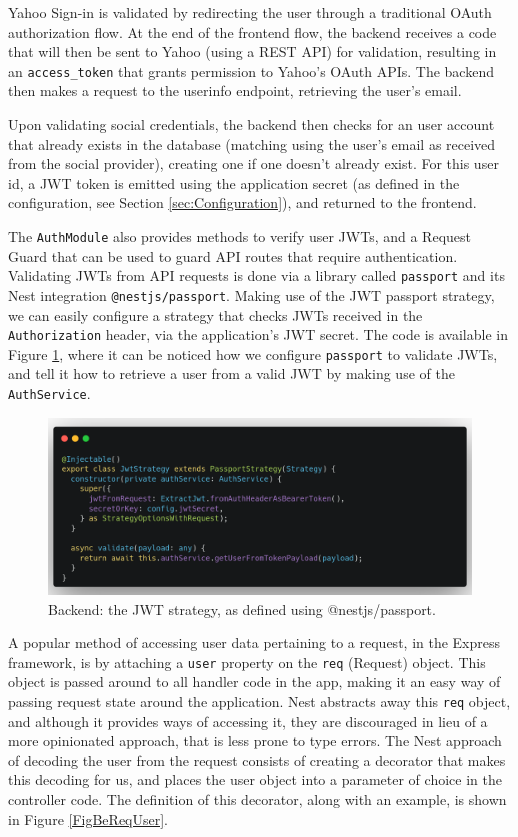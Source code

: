 Yahoo Sign-in is validated by redirecting the user through a traditional OAuth authorization flow. At the end of the frontend flow, the backend receives a code that will then be sent to Yahoo (using a REST API) for validation, resulting in an \verb|access_token| that grants permission to Yahoo's OAuth APIs. The backend then makes a request to the userinfo endpoint, retrieving the user's email.

Upon validating social credentials, the backend then checks for an user account that already exists in the database (matching using the user's email as received from the social provider), creating one if one doesn't already exist. For this user id, a JWT token is emitted using the application secret (as defined in the configuration, see Section \ref{sec:Configuration}), and returned to the frontend.

The \verb|AuthModule| also provides methods to verify user JWTs, and a Request Guard that can be used to guard API routes that require authentication. Validating JWTs from API requests is done via a library called \verb|passport| and its Nest integration \verb|@nestjs/passport|. Making use of the JWT passport strategy, we can easily configure a strategy that checks JWTs received in the \verb|Authorization| header, via the application's JWT secret. The code is available in Figure \ref{FigBeJwtStrategy}, where it can be noticed how we configure \verb|passport| to validate JWTs, and tell it how to retrieve a user from a valid JWT by making use of the \verb|AuthService|.

\begin{figure}[htbp]
    \centering
    \includegraphics[width=1\textwidth]{./figures/code/be_jwt-strategy.png}
    \caption{Backend: the JWT strategy, as defined using @nestjs/passport.}
    \label{FigBeJwtStrategy}
\end{figure}

A popular method of accessing user data pertaining to a request, in the Express framework, is by attaching a \verb|user| property on the \verb|req| (Request) object. This object is passed around to all handler code in the app, making it an easy way of passing request state around the application. Nest abstracts away this \verb|req| object, and although it provides ways of accessing it, they are discouraged in lieu of a more opinionated approach, that is less prone to type errors. The Nest approach of decoding the user from the request consists of creating a decorator that makes this decoding for us, and places the user object into a parameter of choice in the controller code. The definition of this decorator, along with an example, is shown in Figure \ref{FigBeReqUser}.

